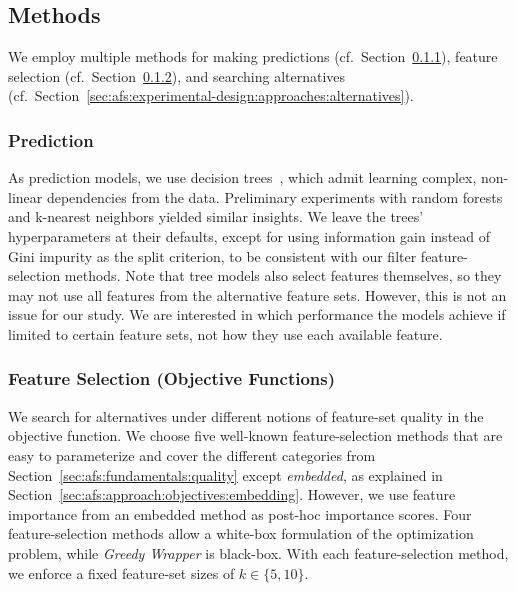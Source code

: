 \documentclass{article}
\theoremstyle{definition}
\begin{document}
\subsection{Methods}
\label{sec:afs:experimental-design:approaches}

We employ multiple methods for making predictions (cf.~Section~\ref{sec:afs:experimental-design:approaches:prediction}), feature selection (cf.~Section~\ref{sec:afs:experimental-design:approaches:feature-selection}), and searching alternatives (cf.~Section~\ref{sec:afs:experimental-design:approaches:alternatives}).

\subsubsection{Prediction}
\label{sec:afs:experimental-design:approaches:prediction}

As prediction models, we use decision trees~\cite{breiman1984classification}, which admit learning complex, non-linear dependencies from the data.
Preliminary experiments with random forests~\cite{breiman2001random} and k-nearest neighbors yielded similar insights.
We leave the trees' hyperparameters at their defaults, except for using information gain instead of Gini impurity as the split criterion, to be consistent with our filter feature-selection methods.
Note that tree models also select features themselves, so they may not use all features from the alternative feature sets.
However, this is not an issue for our study.
We are interested in which performance the models achieve if limited to certain feature sets, not how they use each available feature.

\subsubsection{Feature Selection (Objective Functions)}
\label{sec:afs:experimental-design:approaches:feature-selection}

We search for alternatives under different notions of feature-set quality in the objective function.
We choose five well-known feature-selection methods that are easy to parameterize and cover the different categories from Section~\ref{sec:afs:fundamentals:quality} except \emph{embedded}, as explained in Section~\ref{sec:afs:approach:objectives:embedding}.
However, we use feature importance from an embedded method as post-hoc importance scores.
Four feature-selection methods allow a white-box formulation of the optimization problem, while \emph{Greedy Wrapper} is black-box.
With each feature-selection method, we enforce a fixed feature-set sizes of $k \in \{5,10\}$.
\end{document}
